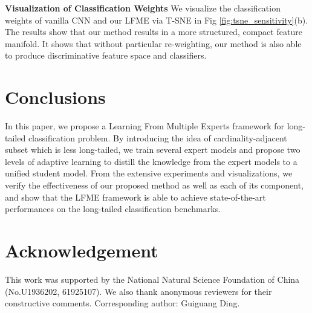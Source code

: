 \documentclass[runningheads]{llncs}
\begin{document}
	
	
	
	\noindent\textbf{Visualization of Classification Weights} \quad
	We visualize the classification weights
	of vanilla CNN and our LFME via T-SNE in Fig  \ref{fig:tsne_sensitivity}(b). The results show that our method results in a more structured, compact feature manifold. It shows that without particular re-weighting, our method is also able to produce discriminative feature space and classifiers.
	
	




	
	


	
	
	
	


	\section{Conclusions}
	In this paper, we propose a Learning From Multiple Experts framework for long-tailed classification problem. By introducing the idea of cardinality-adjacent subset which is less long-tailed, we train several expert models and propose two levels of adaptive learning to distill the knowledge from the expert models to a unified student model. From the extensive experiments and visualizations, we verify the effectiveness of our proposed method as well as each of its component, and show that the LFME framework is able to achieve state-of-the-art performances on the long-tailed classification benchmarks.
	
	
	\section*{Acknowledgement}
	This work was supported by the National Natural Science Foundation of China (No.U1936202, 61925107). We also thank anonymous reviewers for their constructive comments. Corresponding author: Guiguang Ding.
	


	

	
\end{document}
